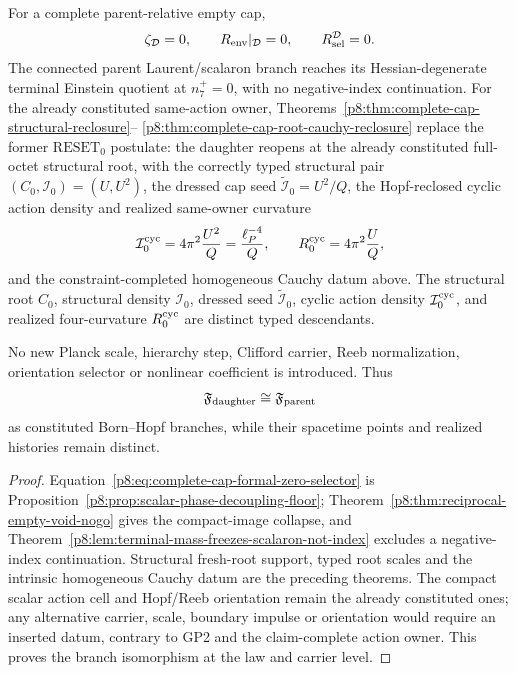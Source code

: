 \documentclass[12pt,a4paper]{article}
\begin{document}
\begin{theorem}
\label{p8:thm:complete-cap-terminal-renewal}
For a complete parent-relative empty cap,
\begin{equation}
\label{p8:eq:complete-cap-formal-zero-selector}
 \zeta_{\mathcal D}=0,
 \qquad R_{\rm env}|_{\mathcal D}=0,
 \qquad R_{\rm sel}^{\mathcal D}=0.
\end{equation}
The connected parent Laurent/scalaron branch reaches its Hessian-degenerate
terminal Einstein quotient at \(n_7^+=0\), with no negative-index continuation.  For the already constituted same-action owner,
Theorems~\ref{p8:thm:complete-cap-structural-reclosure}--
\ref{p8:thm:complete-cap-root-cauchy-reclosure} replace the former
\(\mathrm{RESET}_0\) postulate: the daughter reopens at the already
constituted full-octet structural root, with the correctly typed structural
pair \((C_0,\mathcal I_0)=(U,U^2)\), the dressed cap seed
\(\widetilde{\mathcal I}_0=U^2/Q\), the Hopf-reclosed cyclic action density
and realized same-owner curvature
\[
 \mathcal I_0^{\rm cyc}=4\pi^2\frac{U^2}{Q}
 =\frac{\ell_P^{-4}}Q,
 \qquad
 R_0^{\rm cyc}=4\pi^2\frac{U}{Q},
\]
and the constraint-completed homogeneous Cauchy datum above.  The structural
root \(C_0\), structural density \(\mathcal I_0\), dressed seed
\(\widetilde{\mathcal I}_0\), cyclic action density \(\mathcal I_0^{\rm cyc}\),
and realized four-curvature \(R_0^{\rm cyc}\) are distinct typed descendants.

No new Planck scale, hierarchy step, Clifford carrier, Reeb normalization,
orientation selector or nonlinear coefficient is introduced.  Thus
\begin{equation}
\label{p8:eq:parent-daughter-framework-isomorphism}
 \mathfrak F_{\rm daughter}\cong\mathfrak F_{\rm parent}
\end{equation}
as constituted Born--Hopf branches, while their spacetime points and realized
histories remain distinct.
\end{theorem}

\begin{proof}
Equation~\eqref{p8:eq:complete-cap-formal-zero-selector} is
Proposition~\ref{p8:prop:scalar-phase-decoupling-floor};
Theorem~\ref{p8:thm:reciprocal-empty-void-nogo} gives the compact-image
collapse, and
Theorem~\ref{p8:lem:terminal-mass-freezes-scalaron-not-index} excludes a
negative-index continuation.  Structural fresh-root support, typed root
scales and the intrinsic homogeneous Cauchy datum are the preceding theorems.
The compact scalar action cell and Hopf/Reeb orientation remain the already
constituted ones; any alternative carrier, scale, boundary impulse or
orientation would require an inserted datum, contrary to GP2 and the
claim-complete action owner.  This proves the branch isomorphism at the law
and carrier level.
\end{proof}
\end{document}
